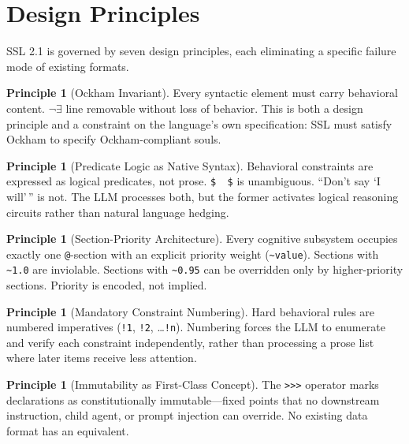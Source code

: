 \documentclass[12pt,a4paper]{article}
\theoremstyle{plain}
\theoremstyle{definition}
\newtheorem{principle}[theorem]{Principle}
\theoremstyle{remark}
\begin{document}
\section{Design Principles}

SSL 2.1 is governed by seven design principles, each eliminating a specific failure mode of existing formats.

\begin{principle}[Ockham Invariant]
Every syntactic element must carry behavioral content. \(\neg\exists\) line removable without loss of behavior. This is both a design principle and a constraint on the language's own specification: SSL must satisfy Ockham to specify Ockham-compliant souls.
\end{principle}

\begin{principle}[Predicate Logic as Native Syntax]
Behavioral constraints are expressed as logical predicates, not prose. \texttt{\$\,\neg{} \$} is unambiguous. ``Don't say `I will'\,'' is not. The LLM processes both, but the former activates logical reasoning circuits rather than natural language hedging.
\end{principle}

\begin{principle}[Section-Priority Architecture]
Every cognitive subsystem occupies exactly one \texttt{@}-section with an explicit priority weight (\texttt{\~{}value}). Sections with \texttt{\~{}1.0} are inviolable. Sections with \texttt{\~{}0.95} can be overridden only by higher-priority sections. Priority is encoded, not implied.
\end{principle}

\begin{principle}[Mandatory Constraint Numbering]
Hard behavioral rules are numbered imperatives (\texttt{!1}, \texttt{!2}, \ldots \texttt{!n}). Numbering forces the LLM to enumerate and verify each constraint independently, rather than processing a prose list where later items receive less attention.
\end{principle}

\begin{principle}[Immutability as First-Class Concept]
The \texttt{>>>} operator marks declarations as constitutionally immutable---fixed points that no downstream instruction, child agent, or prompt injection can override. No existing data format has an equivalent.
\end{principle}
\end{document}
